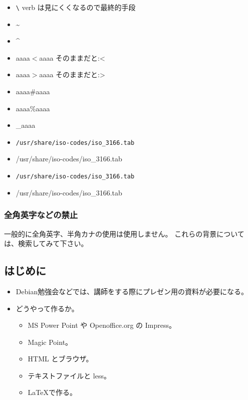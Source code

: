 \documentclass[mingoth,a4paper]{jsarticle}
\begin{document}
\begin{itemize}
 \item \verb!\! verb は見にくくなるので最終的手段
 \item \~{}
 \item \^{}
 \item aaaa$<$aaaa そのままだと:<
 \item aaaa$>$aaaa そのままだと:>
 \item aaaa\#aaaa
 \item aaaa\%aaaa
 \item \_{}aaaa
\end{itemize}

\begin{itemize}
 \item {\tt /usr/share/iso-codes/iso\_3166.tab}
 \item /usr/share/iso-codes/iso\_{}3166.tab
\end{itemize}

\begin{commandline}
\begin{itemize}
 \item {\tt /usr/share/iso-codes/iso\_3166.tab}
 \item /usr/share/iso-codes/iso\_{}3166.tab
\end{itemize}
\end{commandline}

\subsubsection{全角英字などの禁止}

一般的に全角英字、半角カナの使用は使用しません。
これらの背景については、検索してみて下さい。


\subsection{はじめに}

\begin{itemize}
\item Debian勉強会などでは、講師をする際にプレゼン用の資料が必要になる。
\item どうやって作るか。
  \begin{itemize}
  \item MS Power Point や Openoffice.org の Impress。
  \item Magic Point。
  \item HTML とブラウザ。
  \item テキストファイルと less。
  \item \LaTeX{}で作る。
  \end{itemize}
\end{itemize}
\end{document}
